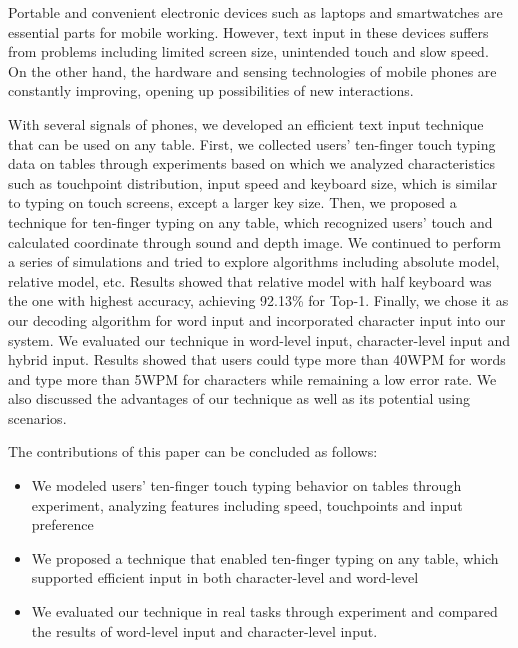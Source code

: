\begin{abstract*}
    Portable and convenient electronic devices such as laptops and smartwatches are essential parts for mobile working. However, text input in these devices suffers from problems including limited screen size, unintended touch and slow speed. On the other hand, the hardware and sensing technologies of mobile phones are constantly improving, opening up possibilities of new interactions.
    
    With several signals of phones, we developed an efficient text input technique that can be used on any table. First, we collected users' ten-finger touch typing data on tables through experiments based on which we analyzed characteristics such as touchpoint distribution, input speed and keyboard size, which is similar to typing on touch screens, except a larger key size. Then, we proposed a technique for ten-finger typing on any table, which recognized users' touch and calculated coordinate through sound and depth image. We continued to perform a series of simulations and tried to explore algorithms including absolute model, relative model, etc. Results showed that relative model with half keyboard was the one with highest accuracy, achieving 92.13\% for Top-1. Finally, we chose it as our decoding algorithm for word input and incorporated character input into our system. We evaluated our technique in word-level input, character-level input and hybrid input. Results showed that users could type more than 40WPM for words and type more than 5WPM for characters while remaining a low error rate. We also discussed the advantages of our technique as well as its potential using scenarios.
    
    The contributions of this paper can be concluded as follows:
    \begin{itemize}
        \item We modeled users' ten-finger touch typing behavior on tables through experiment, analyzing features including speed, touchpoints and input preference
        \item We proposed a technique that enabled ten-finger typing on any table, which supported efficient input in both character-level and word-level
        \item We evaluated our technique in real tasks through experiment and compared the results of word-level input and character-level input.
    \end{itemize}
\end{abstract*}
